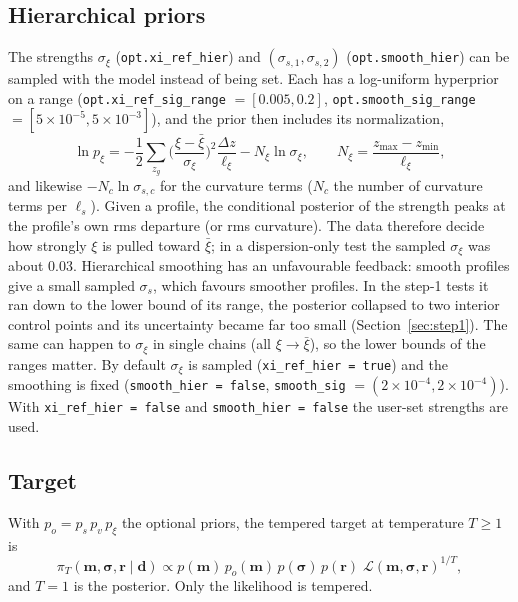 \documentclass[11pt]{article}
\begin{document}
\subsection{Hierarchical priors}\label{sec:hier}
The strengths $\sigma_\xi$ (\texttt{opt.xi\_ref\_hier}) and
$(\sigma_{s,1},\sigma_{s,2})$ (\texttt{opt.smooth\_hier}) can be sampled
with the model instead of being set. Each has a log-uniform hyperprior on a
range (\texttt{opt.xi\_ref\_sig\_range} $=[0.005,0.2]$,
\texttt{opt.smooth\_sig\_range} $=[5\times10^{-5},5\times10^{-3}]$), and the
prior then includes its normalization,
\begin{equation}
 \ln p_\xi=-\frac12\sum_{z_g}\Big(\frac{\xi-\bar\xi}{\sigma_\xi}\Big)^2\frac{\Delta z}{\ell_\xi}-N_\xi\ln\sigma_\xi,\qquad
 N_\xi=\frac{z_{\max}-z_{\min}}{\ell_\xi},
\end{equation}
and likewise $-N_c\ln\sigma_{s,c}$ for the curvature terms ($N_c$ the number
of curvature terms per $\ell_s$). Given a profile, the conditional
posterior of the strength peaks at the profile's own rms departure (or rms
curvature). The data therefore decide how strongly $\xi$ is pulled toward
$\bar\xi$; in a dispersion-only test the sampled $\sigma_\xi$ was about 0.03.
Hierarchical smoothing has an unfavourable feedback: smooth profiles give a
small sampled $\sigma_s$, which favours smoother profiles. In the step-1
tests it ran down to the lower bound of its range, the posterior collapsed
to two interior control points and its uncertainty became far too small
(Section~\ref{sec:step1}). The same can happen to $\sigma_\xi$ in single
chains (all $\xi\to\bar\xi$), so the lower bounds of the ranges matter.
By default $\sigma_\xi$ is sampled (\texttt{xi\_ref\_hier = true}) and the
smoothing is fixed (\texttt{smooth\_hier = false}, \texttt{smooth\_sig}
$=(2\times10^{-4},2\times10^{-4})$). With \texttt{xi\_ref\_hier = false} and
\texttt{smooth\_hier = false} the user-set strengths are used.

\subsection{Target}
With $p_o=p_s\,p_v\,p_\xi$ the optional priors, the tempered target at
temperature $T\ge1$ is
\begin{equation}
 \pi_T(\mathbf{m},\bm\sigma,\mathbf{r}\mid\mathbf{d})\propto p(\mathbf{m})\,p_o(\mathbf{m})\,p(\bm\sigma)\,p(\mathbf{r})\;\mathcal{L}(\mathbf{m},\bm\sigma,\mathbf{r})^{1/T},
\end{equation}
and $T=1$ is the posterior. Only the likelihood is tempered.
\end{document}

